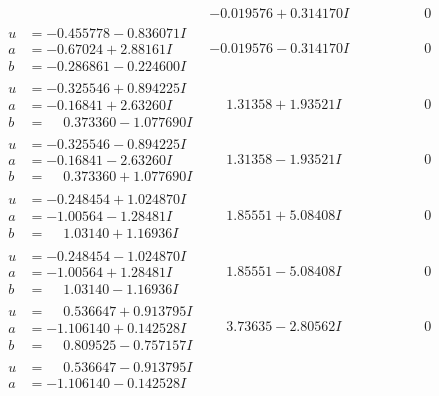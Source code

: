 \documentclass[1p]{elsarticle_modified}
\theoremstyle{definition}
\begin{document}
$$\begin{array}{c|c|c}
 & -0.019576 + 0.314170 I & \phantom{-0.000000 } 0 \\ \hline\begin{aligned}
u &= -0.455778 - 0.836071 I \\
a &= -0.67024 + 2.88161 I \\
b &= -0.286861 - 0.224600 I\end{aligned}
 & -0.019576 - 0.314170 I & \phantom{-0.000000 } 0 \\ \hline\begin{aligned}
u &= -0.325546 + 0.894225 I \\
a &= -0.16841 + 2.63260 I \\
b &= \phantom{-}0.373360 - 1.077690 I\end{aligned}
 & \phantom{-}1.31358 + 1.93521 I & \phantom{-0.000000 } 0 \\ \hline\begin{aligned}
u &= -0.325546 - 0.894225 I \\
a &= -0.16841 - 2.63260 I \\
b &= \phantom{-}0.373360 + 1.077690 I\end{aligned}
 & \phantom{-}1.31358 - 1.93521 I & \phantom{-0.000000 } 0 \\ \hline\begin{aligned}
u &= -0.248454 + 1.024870 I \\
a &= -1.00564 - 1.28481 I \\
b &= \phantom{-}1.03140 + 1.16936 I\end{aligned}
 & \phantom{-}1.85551 + 5.08408 I & \phantom{-0.000000 } 0 \\ \hline\begin{aligned}
u &= -0.248454 - 1.024870 I \\
a &= -1.00564 + 1.28481 I \\
b &= \phantom{-}1.03140 - 1.16936 I\end{aligned}
 & \phantom{-}1.85551 - 5.08408 I & \phantom{-0.000000 } 0 \\ \hline\begin{aligned}
u &= \phantom{-}0.536647 + 0.913795 I \\
a &= -1.106140 + 0.142528 I \\
b &= \phantom{-}0.809525 - 0.757157 I\end{aligned}
 & \phantom{-}3.73635 - 2.80562 I & \phantom{-0.000000 } 0 \\ \hline\begin{aligned}
u &= \phantom{-}0.536647 - 0.913795 I \\
a &= -1.106140 - 0.142528 I \\

\end{aligned}
\end{array}$$
\end{document}
